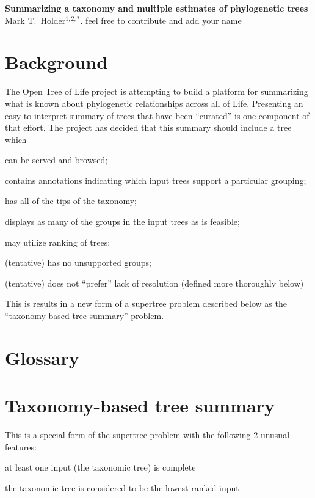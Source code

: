 \documentclass[11pt]{article}
\newcommand{\otol}{Open Tree of Life\xspace}
\begin{document}
\begin{center}
    {\bf Summarizing a taxonomy and multiple estimates of phylogenetic trees} \\
{Mark T.~Holder$^{1,2,\ast}$. feel free to contribute and add your name}
\end{center}
\section{Background}
The \otol project is attempting to build a platform for summarizing what is known
    about phylogenetic relationships across all of Life.
Presenting an easy-to-interpret summary of trees that have been ``curated''
    is one component of that effort.
The project has decided that this summary should include a tree which
\begin{compactenum}
    \item can be served and browsed;
    \item contains annotations indicating which input trees support a particular grouping;
    \item has all of the tips of the taxonomy;
    \item displays as many of the groups in the input trees as is feasible;
    \item may utilize ranking of trees;
    \item (tentative) has no unsupported groups;
    \item (tentative) does not ``prefer'' lack of resolution (defined more thoroughly below)
\end{compactenum}
This is results in a new form of a supertree problem described below as the ``taxonomy-based tree summary'' problem.
\section{Glossary}


\section{Taxonomy-based tree summary}
This is a special form of the supertree problem with the following 2 unusual features:
\begin{compactenum}
    \item at least one input (the taxonomic tree) is complete
    \item the taxonomic tree is considered to be the lowest ranked input
\end{compactenum}


\end{document}
